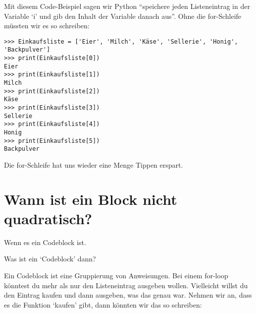 Mit diesem Code-Beispiel sagen wir Python ``speichere jeden Listeneintrag in der Variable `i' und gib den Inhalt der Variable danach aus''. Ohne die for-Schleife müssten wir es so schreiben:

\begin{listing}
\begin{verbatim}
>>> Einkaufsliste = ['Eier', 'Milch', 'Käse', 'Sellerie', 'Honig', 'Backpulver']
>>> print(Einkaufsliste[0])
Eier
>>> print(Einkaufsliste[1])
Milch
>>> print(Einkaufsliste[2])
Käse
>>> print(Einkaufsliste[3])
Sellerie
>>> print(Einkaufsliste[4])
Honig
>>> print(Einkaufsliste[5])
Backpulver
\end{verbatim}
\end{listing}

Die for-Schleife hat uns wieder eine Menge Tippen erspart.

\section{Wann ist ein Block nicht quadratisch?}

Wenn es ein Codeblock ist.
\par
\noindent
Was ist ein `Codeblock' dann?
\par
Ein Codeblock ist eine Gruppierung von Anweisungen. Bei einem for-loop könntest du mehr als nur den Listeneintrag ausgeben wollen. Vielleicht willst du den Eintrag kaufen und dann ausgeben, was das genau war. Nehmen wir an, dass es die Funktion `kaufen' gibt, dann könnten wir das so schreiben:

